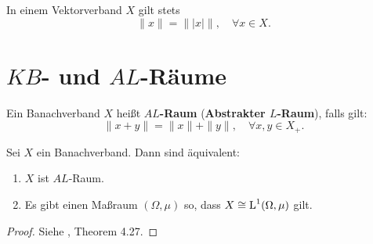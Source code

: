 \begin{bem}\label{Norm und Betrag in Vektorverbänden}
In einem Vektorverband  $X$ gilt stets
\begin{equation*}
\|x \| =  \| |x | \|,\quad\forall x\in X.
\end{equation*}
\end{bem}



 
\newpage\section{$KB$- und $AL$-Räume}

\begin{defi} 
Ein Banachverband $X$ heißt \textbf{$AL$-Raum} (\textbf{Abstrakter $L$-Raum}), falls gilt:
\begin{equation*}
\|x+y\|=\|x\|+\|y\|,\quad\forall x,y\in X_+.
\end{equation*}
\end{defi}




\begin{satz}\label{Charakterisierung von AL-Räumen}
Sei $X$ ein Banachverband. \newline Dann sind äquivalent:
\begin{enumerate}
\item $X$ ist $AL$-Raum.
\item Es gibt einen Maßraum $(\Omega,\mu)$ so, dass $X\cong \textnormal{L}^1(\Omega,\mu)$ gilt.
\end{enumerate}
\end{satz}

\begin{proof}
Siehe \cite{aliprantis_burkinshaw_2006}, Theorem 4.27.
\end{proof}

